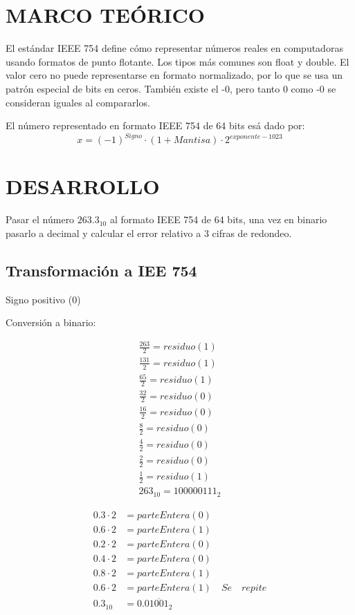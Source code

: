 \documentclass[12pt]{article}
\begin{document}
\section*{MARCO TEÓRICO}
El estándar IEEE 754 define cómo representar números reales en computadoras usando formatos de punto flotante.
Los tipos más comunes son float y double. El valor cero no puede representarse en formato normalizado, por lo que se usa un patrón especial de bits en ceros. También existe el -0, pero tanto 0 como -0 se consideran iguales al compararlos\cite{microsoftIEEE754}.

El número representado en formato IEEE 754 de 64 bits esá dado por:
\[x = (-1)^{Signo} \cdot (1+Mantisa) \cdot 2^{exponente - 1023}\]\cite{bui1999design}
\vspace{0.5cm}

\section*{DESARROLLO}

Pasar el número \(263.3_{10}\) al formato IEEE 754 de 64 bits, una vez en binario pasarlo a decimal y calcular el error relativo a 3 cifras de redondeo.

\subsection*{Transformación a IEE 754}
Signo positivo (0)

Conversión a binario:
    
    \[
        \begin{aligned}
            \frac{263}{2}  = residuo(1) \\
            \frac{131}{2}  = residuo(1) \\
            \frac{65}{2}  = residuo(1) \\
            \frac{32}{2}  = residuo(0) \\
            \frac{16}{2}  = residuo(0) \\
            \frac{8}{2}  = residuo(0) \\
            \frac{4}{2}  = residuo(0) \\
            \frac{2}{2}  = residuo(0) \\
            \frac{1}{2}  = residuo(1) \\
            263_{10} = 100000111_2
        \end{aligned}
    \]

    \[
        \begin{aligned}
            0.3 \cdot 2 &= parteEntera(0) \\
            0.6 \cdot 2 &= parteEntera(1) \\
            0.2 \cdot 2 &= parteEntera(0) \\
            0.4 \cdot 2 &= parteEntera(0) \\
            0.8 \cdot 2 &= parteEntera(1) \\
            0.6 \cdot 2 &= parteEntera(1) \quad Se\quad repite\\
            0.3_{10} &= 0.0\overline{1001}_2
        \end{aligned}
    \]
\end{document}
